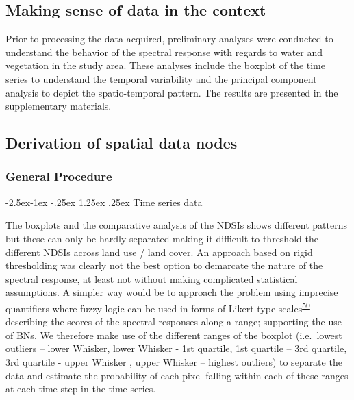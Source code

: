 \documentclass[12pt,oneside]{article}
\makeatletter
\renewcommand\paragraph{\@startsection{paragraph}{4}{\z@}%
            {-2.5ex\@plus -1ex \@minus -.25ex}%
            {1.25ex \@plus .25ex}%
            {\normalfont\normalsize\bfseries}}
\makeatother
\begin{document}
\hypertarget{I4}{%
\subsection{Making sense of data in the context}\label{I4}}

Prior to processing the data acquired, preliminary analyses were conducted to understand the behavior of the spectral response with regards to water and vegetation in the study area. These analyses include the boxplot of the time series to understand the temporal variability and the principal component analysis to depict the spatio-temporal pattern. The results are presented in the supplementary materials.

\hypertarget{I5}{%
\subsection{Derivation of spatial data nodes}\label{I5}}

\hypertarget{I51}{%
\subsubsection{General Procedure}\label{I51}}

\hypertarget{I511}{%
\paragraph{Time series data}\label{I511}}

The boxplots and the comparative analysis of the NDSIs shows different patterns but these can only be hardly separated making it difficult to threshold the different NDSIs across land use / land cover. An approach based on rigid thresholding was clearly not the best option to demarcate the nature of the spectral response, at least not without making complicated statistical assumptions. A simpler way would be to approach the problem using imprecise quantifiers where fuzzy logic can be used in forms of Likert-type scales\textsuperscript{\protect\hyperlink{ref-Likert_1932}{50}} describing the scores of the spectral responses along a range; supporting the use of \href{https://en.wikipedia.org/wiki/Bayesian_network}{BNs}. We therefore make use of the different ranges of the boxplot (i.e.~lowest outliers -- lower Whisker, lower Whisker - 1st quartile, 1st quartile -- 3rd quartile, 3rd quartile - upper Whisker , upper Whisker -- highest outliers) to separate the data and estimate the probability of each pixel falling within each of these ranges at each time step in the time series.
\end{document}
